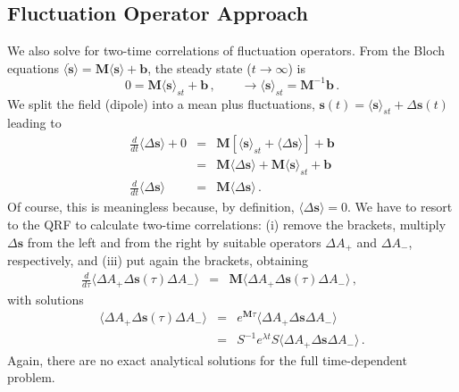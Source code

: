 \documentclass[twocolumn,aps,eqsecnum,showkeys,amsmath]{revtex4-2}
\begin{document}
\subsection{Fluctuation Operator Approach}
We also solve for two-time correlations of fluctuation operators. From the 
Bloch equations $\langle \mathbf{\dot{s}} \rangle = 
\mathbf{M} \langle \mathbf{s} \rangle +\mathbf{b}$, the steady state 
($t \to \infty$) is 
%
\begin{equation}
0 =\mathbf{M} \langle \mathbf{s} \rangle_{st} +\mathbf{b}  \,, 
    \qquad \to \langle \mathbf{s} \rangle_{st} 
       =\mathbf{M}^{-1} \mathbf{b} \,.  \label{eq:SBlochss}	
\end{equation}
We split the field (dipole) into a mean plus fluctuations, 
$\mathbf{s}(t) = \langle \mathbf{s} \rangle_{st} +\Delta \mathbf{s}(t)$ 
leading to 
%
\begin{eqnarray}
\frac{d}{dt} \langle \Delta \mathbf{s} \rangle +0
&=& \mathbf{M} \left[ \langle \mathbf{s} \rangle_{st} 
	+\langle \Delta \mathbf{s} \rangle \right] +\mathbf{b}  \nonumber \\
&=& \mathbf{M} \langle \Delta \mathbf{s} \rangle 
	+\mathbf{M} \langle \mathbf{s} \rangle_{st} +\mathbf{b}  
	\nonumber 	\\
\frac{d}{dt} \langle \Delta \mathbf{s} \rangle 
	&=& \mathbf{M} \langle \Delta \mathbf{s} \rangle  \,.
\end{eqnarray}
Of course, this is meaningless because, by definition, 
$\langle \Delta \mathbf{s} \rangle =0$. We have to resort to the QRF 
to calculate two-time correlations: (i) remove the brackets, multiply 
$\Delta \mathbf{s}$ from the left and from the right by suitable operators 
$\Delta A_+$ and $\Delta A_-$, respectively, and (iii) put again the 
brackets, obtaining 
%
\begin{eqnarray}
\frac{d}{d\tau} \langle \Delta A_+ \Delta \mathbf{s}(\tau) \Delta A_- \rangle 
 &=& \mathbf{M} \langle \Delta A_+ \Delta \mathbf{s}(\tau) \Delta A_- \rangle  \,, 
 	\qquad	
\end{eqnarray}
with solutions 
%
\begin{eqnarray} 	\label{eq:FlucCorrSol}
\langle \Delta A_+ \Delta \mathbf{s}(\tau) \Delta A_- \rangle 
 &=& e^{\mathbf{M} \tau} \langle \Delta A_+ \Delta \mathbf{s} 
 	\Delta A_- \rangle  	\\ 
&=& S^{-1} e^{\lambda t} S  \langle \Delta A_+ \Delta \mathbf{s} 
 	\Delta A_- \rangle 	\,.	\nonumber
\end{eqnarray}
Again, there are no exact analytical solutions for the full time-dependent 
problem. 
\end{document}
